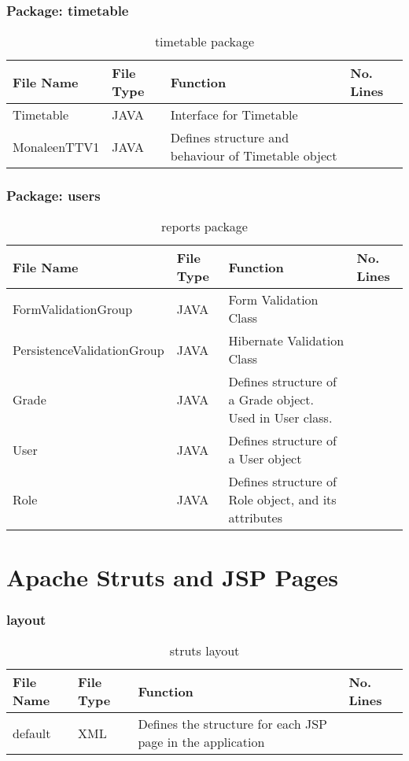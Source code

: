 \subsubsection{Package: timetable}
\begin{table}[H]
\begin{center}
     \begin{tabular}{| l | l | l| p{1cm} |}
    \hline
    File Name & File Type & Function & No. Lines\\ \hline
    Timetable & JAVA & Interface for Timetable\\ \hline
	MonaleenTTV1 & JAVA & Defines structure and behaviour of Timetable object\\ \hline
    \end{tabular}
\end{center}
\caption{timetable package}
\end{table}

\subsubsection{Package: users}
\begin{table}[H]
\begin{center}
    \begin{tabular}{| l | l | l| p{1cm} |}
    \hline
    File Name & File Type & Function & No. Lines\\ \hline
    FormValidationGroup & JAVA & Form Validation Class\\ \hline
	PersistenceValidationGroup & JAVA & Hibernate Validation Class\\ \hline
	Grade & JAVA & Defines structure of a Grade object. Used in  User class.\\ \hline
	User & JAVA & Defines structure of a User object\\ \hline
	Role & JAVA & Defines structure of Role object, and its attributes\\ \hline	
    \end{tabular}
\end{center}
\caption{reports package}
\end{table}

\section{Apache Struts and JSP Pages}

\subsubsection{layout}
\begin{table}[H]
\begin{center}
     \begin{tabular}{| l | l | l| p{1cm} |}
    \hline
    File Name & File Type & Function & No. Lines\\ \hline
	default & XML & Defines the structure for each JSP page in the application\\ \hline	
    \end{tabular}
\end{center}
\caption{struts layout}
\end{table}

